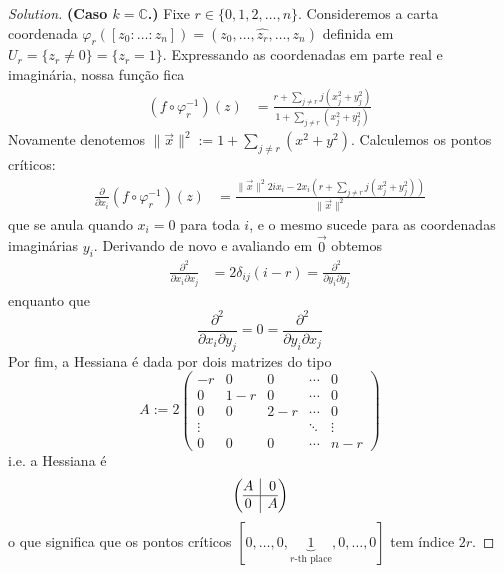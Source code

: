 \begin{proof}[Solution]
\textbf{(Caso \(k=\mathbb{C}\).)} Fixe \(r \in \{0,1,2,\ldots,n\}\). Consideremos a carta coordenada \(\varphi_r([z_0:\ldots:z_n])	= (z_0,\ldots,\widehat{z_r},\ldots,z_n)\) definida em \(U_r=\{z_r \neq 0\}=\{z_r=1\}\).  Expressando as coordenadas em parte real e imaginária, nossa função fica
\begin{align*}
	(f \circ \varphi_r^{-1})(z)&=\frac{r+\sum_{j \neq  r}j(x_j^2+y_j^2)}{1+\sum_{j \neq r}(x_j^2+y_j^2)}
\end{align*}
Novamente denotemos \(\|\vec{x}\|^2:=1+\sum_{j \neq r}(x^2+y^2)\). Calculemos os pontos críticos:
\begin{align*}
\frac{\partial }{\partial x_i}(f \circ \varphi_r^{-1})(z)&=\frac{\|\vec{x}\|^2 2ix_i-2x_i\left(r+\sum_{j \neq r}j(x_j^2+y_j^2)\right)}{\|\vec{x}\|^2}
\end{align*}
que se anula quando \(x_i=0\) para toda \(i\), e o mesmo sucede para as coordenadas imaginárias \(y_i\). Derivando de novo e avaliando em \(\vec{0}\) obtemos
\begin{align*}
\frac{\partial^2 }{\partial x_i\partial x_j}&=2\delta_{ij}(i-r)=\frac{\partial^2 }{\partial y_i\partial y_j}
\end{align*}
enquanto que
\[\frac{\partial^2 }{\partial x_i\partial y_j}=0=\frac{\partial^2 }{\partial y_i\partial x_j}\]
Por fim, a Hessiana é dada por dois matrizes do tipo
\[A:=2\begin{pmatrix} -r & 0 &0 & \cdots &0\\
0 & 1-r & 0& \cdots & 0\\
0 & 0 & 2-r & \cdots & 0\\
\vdots & & &\ddots &\vdots \\
0 & 0 & 0 & \cdots & n-r\end{pmatrix}\]
i.e. a Hessiana é
\[\left(\begin{array}{@{}c|c@{}}
A&0\\
\hline
0&A\end{array}\right)\]
o que significa que os pontos críticos \([0,\ldots,0,\underbrace{1}_{r \text{-th place} },0,\ldots,0]\) tem índice \(2r\).


\end{proof}
